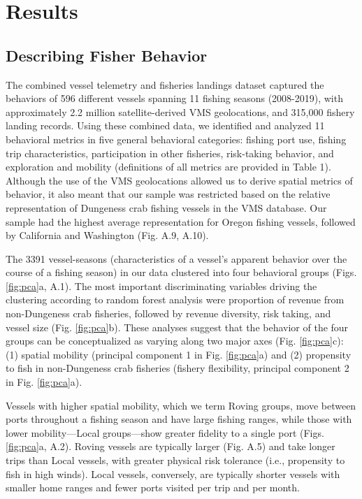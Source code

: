 \documentclass[]{elsarticle} %
\begin{document}
\hypertarget{results}{%
\section{Results}\label{results}}

\hypertarget{describing-fisher-behavior}{%
\subsection{Describing Fisher
Behavior}\label{describing-fisher-behavior}}

The combined vessel telemetry and fisheries landings dataset captured
the behaviors of 596 different vessels spanning 11 fishing seasons
(2008-2019), with approximately 2.2 million satellite-derived VMS
geolocations, and 315,000 fishery landing records. Using these combined
data, we identified and analyzed 11 behavioral metrics in five general
behavioral categories: fishing port use, fishing trip characteristics,
participation in other fisheries, risk-taking behavior, and exploration
and mobility (definitions of all metrics are provided in Table 1).
Although the use of the VMS geolocations allowed us to derive spatial
metrics of behavior, it also meant that our sample was restricted based
on the relative representation of Dungeness crab fishing vessels in the
VMS database. Our sample had the highest average representation for
Oregon fishing vessels, followed by California and Washington (Fig. A.9,
A.10).

The 3391 vessel-seasons (characteristics of a vessel's apparent behavior
over the course of a fishing season) in our data clustered into four
behavioral groups (Figs. \ref{fig:pca}a, A.1). The most important
discriminating variables driving the clustering according to random
forest analysis were proportion of revenue from non-Dungeness crab
fisheries, followed by revenue diversity, risk taking, and vessel size
(Fig. \ref{fig:pca}b). These analyses suggest that the behavior of the
four groups can be conceptualized as varying along two major axes (Fig.
\ref{fig:pca}c): (1) spatial mobility (principal component 1 in Fig.
\ref{fig:pca}a) and (2) propensity to fish in non-Dungeness crab
fisheries (fishery flexibility, principal component 2 in Fig.
\ref{fig:pca}a).

Vessels with higher spatial mobility, which we term Roving groups, move
between ports throughout a fishing season and have large fishing ranges,
while those with lower mobility---Local groups---show greater fidelity
to a single port (Figs. \ref{fig:pca}a, A.2). Roving vessels are
typically larger (Fig. A.5) and take longer trips than Local vessels,
with greater physical risk tolerance (i.e., propensity to fish in high
winds). Local vessels, conversely, are typically shorter vessels with
smaller home ranges and fewer ports visited per trip and per month.
\end{document}

